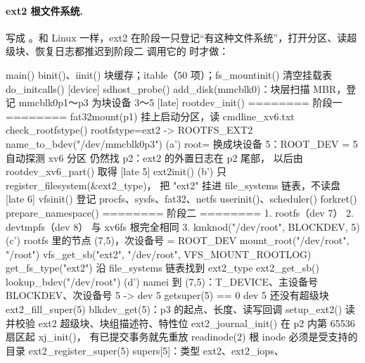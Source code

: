 \paragraph{ext2 根文件系统.}  写成 。和 Linux 一样，ext2 在阶段一只登记“有这种文件系统”，打开分区、读超级块、恢复日志都推迟到阶段二  调用它的  时才做：

\begin{txtcode}
main()
  binit()、iinit()                     块缓存；itable（50 项）；fs_mountinit() 清空挂载表
  do_initcalls()
    [device] sdhost_probe()            add_disk(mmcblk0)：块层扫描 MBR，登记
                                       mmcblk0p1～p3 为块设备 3～5
    [late]   rootdev_init()            ======== 阶段一 ========
      fat32mount(p1)                   挂上启动分区，读 cmdline_xv6.txt
      check_rootfstype()               rootfstype=ext2 -> ROOTFS_EXT2
      name_to_bdev("/dev/mmcblk0p3")
                                  (a') root= 换成块设备 5：ROOT_DEV = 5
      自动探测 xv6 分区                仍然找 p2：ext2 的外置日志在 p2 尾部，
                                       以后由 rootdev_xv6_part() 取得
    [late 5] ext2init()           (b') 只 register_filesystem(&ext2_type)，
                                       把 "ext2" 挂进 file_systems 链表，不读盘
    [late 6] vfsinit()                 登记 procfs、sysfs、fat32、netfs
  userinit()、scheduler()
forkret()
  prepare_namespace()                  ======== 阶段二 ========
    1. rootfs（dev 7） 2. devtmpfs（dev 8）
                                       与 xv6fs 根完全相同
    3. kmknod("/dev/root", BLOCKDEV, 5)
                                  (c') rootfs 里的节点 (7,5)，次设备号 = ROOT_DEV
       mount_root("/dev/root", "/root")
         vfs_get_sb("ext2", "/dev/root", VFS_MOUNT_ROOTLOG)
           get_fs_type("ext2")         沿 file_systems 链表找到 ext2_type
           ext2_get_sb()
             lookup_bdev("/dev/root")
                                  (d') namei 到 (7,5)：T_DEVICE、主设备号
                                       BLOCKDEV、次设备号 5 -> dev 5
             getsuper(5) == 0          dev 5 还没有超级块
             ext2_fill_super(5)        blkdev_get(5)：p3 的起点、长度、读写回调
               setup_ext2()            读并校验 ext2 超级块、块组描述符、特性位
               ext2_journal_init()     在 p2 内第 65536 扇区起 xj_init()，
                                       有已提交事务就先重放
               readinode(2)            根 inode 必须是受支持的目录
               ext2_register_super(5)  supers[5]：类型 ext2、ext2_iops、

\end{txtcode}
